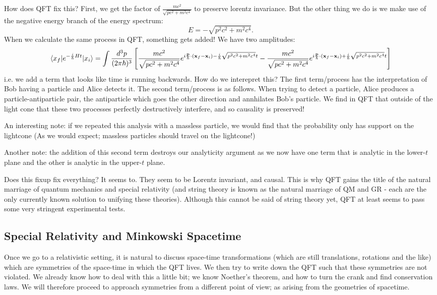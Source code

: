 How does QFT fix this? First, we get the factor of $\frac{mc^2}{\sqrt{pc^2 + m^2c^4}}$ to preserve lorentz invariance. But the other thing we do is we make use of the negative energy branch of the energy spectrum:
\begin{equation}
    E = -\sqrt{p^2c^2 + m^2c^4}.
\end{equation}
When we calculate the same process in QFT, something gets added! We have two amplitudes:
\begin{equation}
    \langle x_f \rvert e^{-\frac{i}{\hbar}Ht}\lvert x_i \rangle = \int \frac{d^3p}{(2\pi\hbar)^3}\left[\frac{mc^2}{\sqrt{pc^2 + m^2c^4}}e^{i\frac{\mathbf{p}}{\hbar}\cdot(\mathbf{x}_f - \mathbf{x}_i) -\frac{i}{\hbar}\sqrt{p^2c^2 + m^2c^4}t} - \frac{mc^2}{\sqrt{pc^2 + m^2c^4}}e^{i\frac{\mathbf{p}}{\hbar}\cdot(\mathbf{x}_f - \mathbf{x}_i) +\frac{i}{\hbar}\sqrt{p^2c^2 + m^2c^4}t}\right]
\end{equation}
i.e. we add a term that looks like time is running backwards. How do we interepret this? The first term/process has the interpretation of Bob having a particle and Alice detects it. The second term/process is as follows. When trying to detect a particle, Alice produces a particle-antiparticle pair, the antiparticle which goes the other direction and annhilates Bob's particle. We find in QFT that outside of the light cone that these two processes perfectly destructively interfere, and so causality is preserved!

An interesting note: if we repeated this analysis with a massless particle, we would find that the probability only has support on the lightcone (As we would expect; massless particles should travel on the lightcone!)

Another note: the addition of this second term destroys our analyticity argument as we now have one term that is analytic in the lower-$t$ plane and the other is analytic in the upper-$t$ plane.

Does this fixup fix everything? It seems to. They seem to be Lorentz invariant, and causal. This is why QFT gains the title of the natural marriage of quantum mechanics and special relativity (and string theory is known as the natural marriage of QM and GR - each are the only currently known solution to unifying these theories). Although this cannot be said of string theory yet, QFT at least seems to pass some very stringent experimental tests.

\subsection{Special Relativity and Minkowski Spacetime}
Once we go to a relativistic setting, it is natural to discuss space-time transformations (which are still translations, rotations and the like) which are symmetries of the space-time in which the QFT lives. We then try to write down the QFT such that these symmetries are not violated. We already know how to deal with this a little bit; we know Noether's theorem, and how to turn the crank and find conservation laws. We will therefore proceed to approach symmetries from a different point of view; as arising from the geometries of spacetime.

